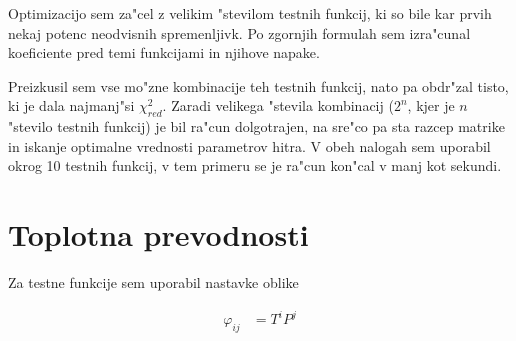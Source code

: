 \documentclass[a4paper,10pt]{article}
\begin{document}
Optimizacijo sem za"cel z velikim "stevilom testnih funkcij, ki so bile kar prvih nekaj potenc neodvisnih spremenljivk. Po zgornjih formulah sem izra"cunal koeficiente pred temi funkcijami in njihove napake.

\begin{comment}

Nato sem odstranjeval testne funkcije po algoritmu na sliki \ref{fig:alg-izlocanje}. 

\begin{figure}[!h]
\centering
\begin{tikzpicture}[node distance = 3cm, auto]
 \node[cloud] (init) {Priprava matrike $\mathbf{S}$};
 \node[block, below of=init] (step) {Izra"cun koeficientov $\mathbf{a}$ z uporabo razcepa $\texttt{SVD}$};
 \node[decision, below of=step] (test) {Je $\chi^2_{red}$ manj"si kot prej?};
 \node[cloud, below of=test] (stop) {Konec};
  \node[block, left of=step] (remove) {Odstrani parameter z najve"cjo napako in ustrezen stolpec v $\mathbf{S}$};

\path[line] (init) -- (step);
\path[line] (step) -- (test);
\path[line] (test) -- node {Ne}(stop);
\path[line] (test) -| node {Da}(remove);
\path[line] (remove) |- (step);
\end{tikzpicture}
\caption{Shema algoritma za izlo"canje nepomembnih testnih funkcij}
\end{figure}

Ker so bili vsi moji podatk\label{fig:alg-izlocanje}
i normirani, sem lahko primerjal kar absolutne napake koeficientov, tako da sem vedno izklju"cil tistega, ki je najmanj vplival na $\chi^2$. 

\end{comment}

Preizkusil sem vse mo"zne kombinacije teh testnih funkcij, nato pa obdr"zal tisto, ki je dala najmanj"si $\chi^2_{red}$. Zaradi velikega "stevila kombinacij ($2^n$, kjer je $n$ "stevilo testnih funkcij) je bil ra"cun dolgotrajen, na sre"co pa sta razcep matrike in iskanje optimalne vrednosti parametrov hitra. V obeh nalogah sem uporabil okrog 10 testnih funkcij, v tem primeru se je ra"cun kon"cal v manj kot sekundi. 

\section{Toplotna prevodnosti}

Za testne funkcije sem uporabil nastavke oblike

\begin{align}
 \varphi_{ij} &= T^i P^j
\end{align}
\end{document}
